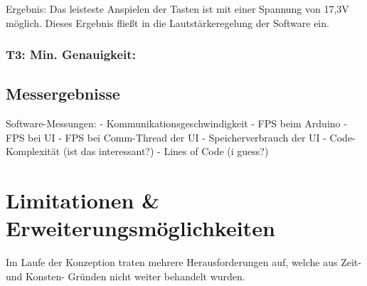Ergebnis: Das leisteste Anspielen der Tasten ist mit einer Spannung von 17,3V möglich.
Dieses Ergebnis fließt in die Lautstärkeregelung der Software ein.


\subsubsection{T3: Min. Genauigkeit:}




\subsection{Messergebnisse} \label{tests-messungen}

Software-Messungen: \newline
- Kommunikationsgeschwindigkeit \newline
- FPS beim Arduino \newline
- FPS bei UI \newline
- FPS bei Comm-Thread der UI \newline
- Speicherverbrauch der UI \newline
- Code-Komplexität (ist das interessant?) \newline
- Lines of Code (i guess?) \newline





\section{Limitationen \& Erweiterungsmöglichkeiten} \label{ergebnisse-limitationen}


Im Laufe der Konzeption traten mehrere Herausforderungen auf, welche aus Zeit- und Konsten- Gründen nicht weiter
behandelt wurden.
